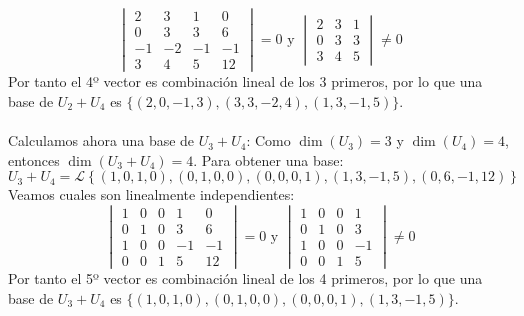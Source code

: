 \begin{ejercicio}
\begin{enumerate}
\begin{equation*}
				\begin{vmatrix}
					2  & 3  & 1  & 0  \\
					0  & 3  & 3  & 6  \\
					-1 & -2 & -1 & -1 \\
					3  & 4  & 5  & 12
				\end{vmatrix} = 0 \text { y } \begin{vmatrix}
					2 & 3 & 1 \\
					0 & 3 & 3 \\
					3 & 4 & 5
				\end{vmatrix} \neq 0
			\end{equation*}
			Por tanto el 4º vector es combinación lineal de los 3 primeros, por lo que una base de $U_2 + U_4$ es $\{(2,0,-1,3), (3,3,-2,4), (1,3,-1,5)\}$.
			\\ \\
			Calculamos ahora una base de $U_3 + U_4$:
			Como $\dim(U_3) = 3$ y $\dim(U_4) = 4$, entonces $\dim(U_3 + U_4) = 4$. Para obtener una base:
			\begin{equation*}
				U_3 + U_4 = \mathcal{L}\left\{(1,0,1,0), (0,1,0,0), (0,0,0,1), (1,3,-1,5), (0,6,-1,12)\right\}
			\end{equation*}
			Veamos cuales son linealmente independientes:
			\begin{equation*}
				\begin{vmatrix}
					1 & 0 & 0 & 1  & 0  \\
					0 & 1 & 0 & 3  & 6  \\
					1 & 0 & 0 & -1 & -1 \\
					0 & 0 & 1 & 5  & 12
				\end{vmatrix} = 0 \text { y } \begin{vmatrix}
					1 & 0 & 0 & 1  \\
					0 & 1 & 0 & 3  \\
					1 & 0 & 0 & -1 \\
					0 & 0 & 1 & 5
				\end{vmatrix} \neq 0
			\end{equation*}
			Por tanto el 5º vector es combinación lineal de los 4 primeros, por lo que una base de $U_3 + U_4$ es $\{(1,0,1,0), (0,1,0,0), (0,0,0,1), (1,3,-1,5)\}$.
	\end{enumerate}

\end{ejercicio}

